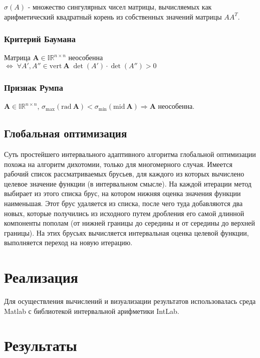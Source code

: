 \documentclass[a4paper]{article}
\begin{document}
$\sigma(A)$ - множество сингулярных чисел матрицы, вычисляемых как арифметический квадратный корень из собственных значений матрицы $AA^T$.
\subsubsection{Критерий Баумана}
Матрица $\mathbf{A}\in\mathbb{IR}^{n\times n}$ неособенна $\Leftrightarrow\;\forall A',A''\in\mathrm{vert}\:\mathbf{A}\;\det(A')\cdot\det(A'')>0$ 
\subsubsection{Признак Румпа}
$\mathbf{A}\in\mathbb{IR}^{n\times n}$, $\sigma_{\mathrm{max}}(\mathrm{rad}\:\mathbf{A})<\sigma_{\mathrm{min}}(\mathrm{mid}\:\mathbf{A})\Rightarrow\mathbf{A}$ неособенна.
\subsection{Глобальная оптимизация}
Суть простейшего интервального адаптивного алгоритма глобальной оптимизации похожа на алгоритм дихотомии, только для многомерного случая. Имеется рабочий список рассматриваемых брусьев, для каждого из которых вычислено целевое значение функции (в интервальном смысле). На каждой итерации метод выбирает из этого списка брус, на котором нижняя оценка значения функции наименьшая. Этот брус удаляется из списка, после чего туда добавляются два новых, которые получились из исходного путем дробления его самой длинной компоненты пополам (от нижней границы до середины и от середины до верхней границы). На этих брусьях вычисляется интервальная оценка целевой функции, выполняется переход на новую итерацию.
\section{Реализация}
Для осуществления вычислений и визуализации результатов использовалась среда Matlab с библиотекой интервальной арифметики IntLab.
\section{Результаты}
\end{document}
